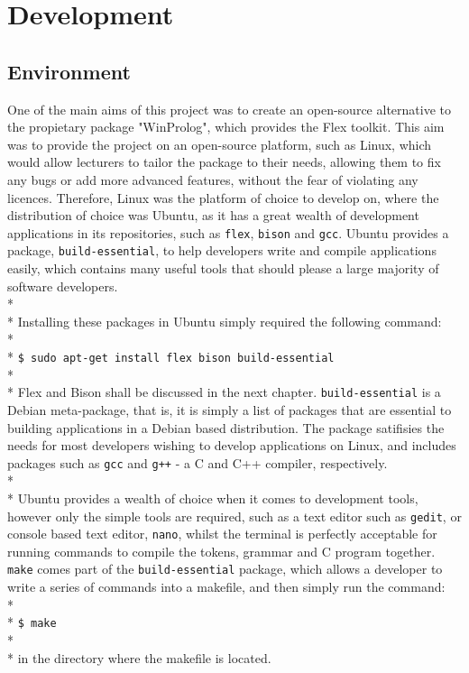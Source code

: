 \documentclass[12pt]{report}
\begin{document}
\section{Development}\label{sec:development}
\subsection{Environment}\label{subsec:dev_environment}
One of the main aims of this project was to create an open-source alternative to the propietary package "WinProlog", which provides the Flex toolkit.  This aim was to provide the project on an open-source platform, such as Linux, which would allow lecturers to tailor the package to their needs, allowing them to fix any bugs or add more advanced features, without the fear of violating any licences.  Therefore, Linux was the platform of choice to develop on, where the distribution of choice was Ubuntu, as it has a great wealth of development applications in its repositories, such as \texttt{flex}, \texttt{bison} and \texttt{gcc}.  Ubuntu provides a package, \texttt{build-essential}, to help developers write and compile applications easily, which contains many useful tools that should please a large majority of software developers.
\\*
\\*
Installing these packages in Ubuntu simply required the following command:
\\*
\\*
\texttt{\$ sudo apt-get install flex bison build-essential}
\\*
\\*
Flex and Bison shall be discussed in the next chapter.  \texttt{build-essential} is a Debian meta-package, that is, it is simply a list of packages that are essential to building applications in a Debian based distribution.  The package satifisies the needs for most developers wishing to develop applications on Linux, and includes packages such as \texttt{gcc} and \texttt{g++} - a C and C++ compiler, respectively.
\\*
\\*
Ubuntu provides a wealth of choice when it comes to development tools, however only the simple tools are required, such as a text editor such as \texttt{gedit}, or console based text editor, \texttt{nano}, whilst the terminal is perfectly acceptable for running commands to compile the tokens, grammar and C program together.  \texttt{make} comes part of the \texttt{build-essential} package, which allows a developer to write a series of commands into a makefile, and then simply run the command:\\*\\*
\texttt{\$ make}
\\*
\\*
in the directory where the makefile is located.
\end{document}
